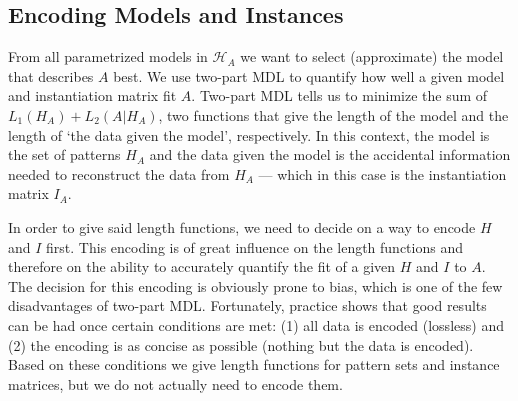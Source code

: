 \documentclass{llncs}
\begin{document}

\subsection{Encoding Models and Instances}

From all parametrized models in $\mathcal{H}_A$ we want to select (approximate) the model that describes $A$ best. We use two-part MDL to quantify how well a given model and instantiation matrix fit $A$. Two-part MDL tells us to minimize the sum of $L_1(H_A) + L_2(A|H_A)$, two functions that give the length of the model and the length of `the data given the model', respectively. In this context, the model is the set of patterns $H_A$ and the data given the model is the accidental information needed to reconstruct the data from $H_A$ --- which in this case is the instantiation matrix $I_A$.

In order to give said length functions, we need to decide on a way to encode $H$ and $I$ first. This encoding is of great influence on the length functions and therefore on the ability to accurately quantify the fit of a given $H$ and $I$ to $A$. The decision for this encoding is obviously prone to bias, which is one of the few disadvantages of two-part MDL. Fortunately, practice shows that good results can be had once certain conditions are met: (1) all data is encoded (lossless) and (2) the encoding is as concise as possible (nothing but the data is encoded). Based on these conditions we give length functions for pattern sets and instance matrices, but we do not actually need to encode them. 
 
\end{document}

